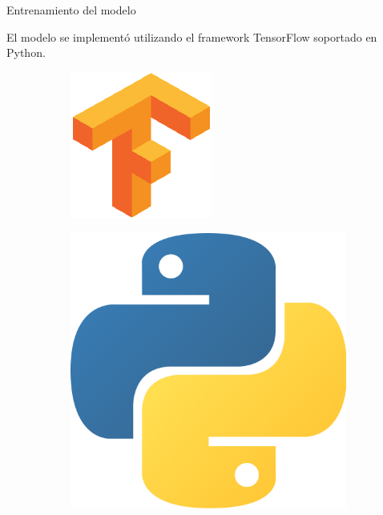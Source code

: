\documentclass[12pt,aspectratio=169]{beamer}
\begin{document}
\begin{frame}{Entrenamiento del modelo}

    {\scriptsize
    El modelo se implementó utilizando el framework TensorFlow soportado en Python.

    \begin{figure}[h]
        \begin{subfigure}{0.4\textwidth}
            \centering
            \includegraphics[scale=0.2]{figs/tensorflow.png}
        \end{subfigure}
        \begin{subfigure}{0.46\textwidth}
            \centering
            \includegraphics[scale=0.03]{figs/python.png}  
        \end{subfigure}
    \end{figure}
    
}
\end{frame}
\end{document}
